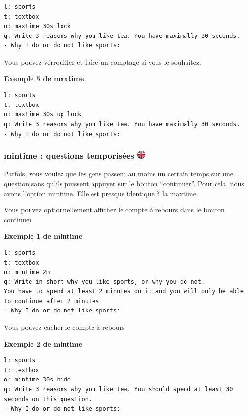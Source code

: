 \documentclass[
]{book}
\begin{document}
\begin{verbatim}
l: sports
t: textbox
o: maxtime 30s lock
q: Write 3 reasons why you like tea. You have maximally 30 seconds.
- Why I do or do not like sports:
\end{verbatim}

Vous pouvez vérrouiller et faire un comptage si vous le souhaitez.

\textbf{Exemple 5 de maxtime}

\begin{verbatim}
l: sports
t: textbox
o: maxtime 30s up lock
q: Write 3 reasons why you like tea. You have maximally 30 seconds.
- Why I do or do not like sports:
\end{verbatim}

\hypertarget{mintime-questions-temporisuxe9es-ukflag}{%
\subsubsection[mintime : questions temporisées ]{\texorpdfstring{mintime
: questions temporisées
\href{https://www.psytoolkit.org/doc3.1.0/online-survey-syntax.html\#mintime}{\protect\includegraphics{img/ukflag.png}}}{mintime : questions temporisées ukflag}}\label{mintime-questions-temporisuxe9es-ukflag}}

Parfois, vous voulez que les gens passent au moins un certain temps sur
une question sans qu'ils puissent appuyer sur le bouton ``continuer''.
Pour cela, nous avons l'option mintime. Elle est presque identique à la
maxtime.

Vous pouvez optionnellement afficher le compte à rebours dans le bouton
continuer

\textbf{Exemple 1 de mintime}

\begin{verbatim}
l: sports
t: textbox
o: mintime 2m
q: Write in short why you like sports, or why you do not.
You have to spend at least 2 minutes on it and you will only be able to continue after 2 minutes
- Why I do or do not like sports:
\end{verbatim}

Vous pouvez cacher le compte à rebours

\textbf{Exemple 2 de mintime}

\begin{verbatim}
l: sports
t: textbox
o: mintime 30s hide
q: Write 3 reasons why you like tea. You should spend at least 30 seconds on this question.
- Why I do or do not like sports:
\end{verbatim}
\end{document}
